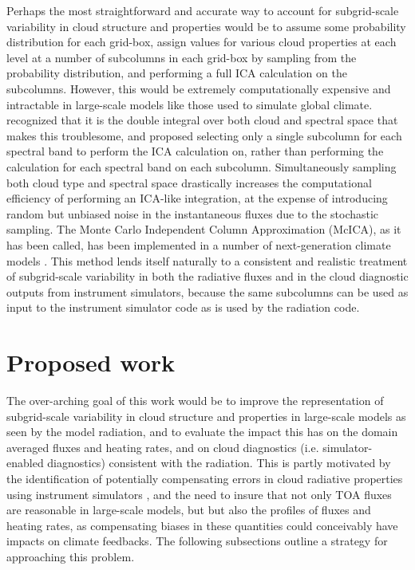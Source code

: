 \documentclass{article}
\begin{document}
Perhaps the most straightforward and accurate way to account for subgrid-scale variability in cloud structure and properties would be to assume some probability distribution for each grid-box, assign values for various cloud properties at each level at a number of subcolumns in each grid-box by sampling from the probability distribution, and performing a full ICA calculation on the subcolumns. However, this would be extremely computationally expensive and intractable in large-scale models like those used to simulate global climate. \cite{pincus_et_al_2003} recognized that it is the double integral over both cloud and spectral space that makes this troublesome, and proposed selecting only a single subcolumn for each spectral band to perform the ICA calculation on, rather than performing the calculation for each spectral band on each subcolumn. Simultaneously sampling both cloud type and spectral space drastically increases the computational efficiency of performing an ICA-like integration, at the expense of introducing random but unbiased noise in the instantaneous fluxes due to the stochastic sampling. The Monte Carlo Independent Column Approximation (McICA), as it has been called, has been implemented in a number of next-generation climate models \citep[e.g.][]{cam5_description,donner_et_al_2011,von_salzen_et_al_2012}. This method lends itself naturally to a consistent and realistic treatment of subgrid-scale variability in both the radiative fluxes and in the cloud diagnostic outputs from instrument simulators, because the same subcolumns can be used as input to the instrument simulator code as is used by the radiation code.

\section{Proposed work}
The over-arching goal of this work would be to improve the representation of subgrid-scale variability in cloud structure and properties in large-scale models as seen by the model radiation, and to evaluate the impact this has on the domain averaged fluxes and heating rates, and on cloud diagnostics (i.e. simulator-enabled diagnostics) consistent with the radiation. This is partly motivated by the identification of potentially compensating errors in cloud radiative properties using instrument simulators \citep[e.g.][]{kay_et_al_2012,hillman_2012}, and the need to insure that not only TOA fluxes are reasonable in large-scale models, but but also the profiles of fluxes and heating rates, as compensating biases in these quantities could conceivably have impacts on climate feedbacks. The following subsections outline a strategy for approaching this problem.
\end{document}
